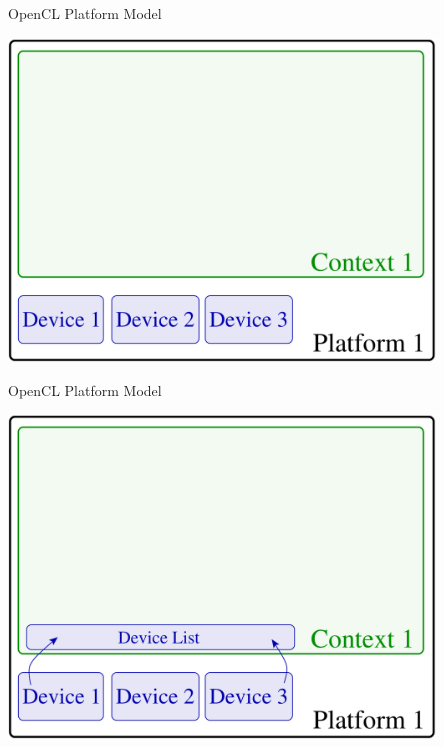 \begin{frame}{OpenCL Platform Model}
 \begin{center}
   \includegraphics[width=0.85\textwidth]{figs/opencl-4.pdf}
 \end{center}
\end{frame}

\begin{frame}{OpenCL Platform Model}
 \begin{center}
   \includegraphics[width=0.85\textwidth]{figs/opencl-5.pdf}
 \end{center}
\end{frame}

